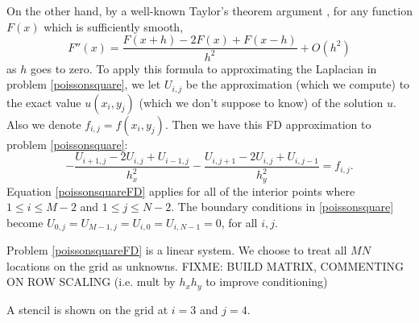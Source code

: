 On the other hand, by a well-known Taylor's theorem argument \citep{MortonMayers}, for any function $F(x)$ which is sufficiently smooth,
    $$F''(x) = \frac{F(x+h) - 2 F(x) + F(x-h)}{h^2} + O(h^2)$$
as $h$ goes to zero.  To apply this formula to approximating the Laplacian in problem \eqref{poissonsquare}, we let $U_{i,j}$ be the approximation (which we compute) to the exact value $u(x_i,y_j)$ (which we don't suppose to know) of the solution $u$.  Also we denote $f_{i,j} = f(x_i,y_j)$.  Then we have this FD approximation to problem \eqref{poissonsquare}:
\begin{equation}
- \frac{U_{i+1,j} - 2 U_{i,j} + U_{i-1,j}}{h_x^2} - \frac{U_{i,j+1} - 2 U_{i,j} + U_{i,j-1}}{h_y^2} = f_{i,j}. \label{poissonsquareFD}
\end{equation}
Equation \eqref{poissonsquareFD} applies for all of the interior points where $1 \le i \le M-2$ and $1 \le j \le N-2$.  The boundary conditions in \eqref{poissonsquare} become $U_{0,j} = U_{M-1,j} = U_{i,0} = U_{i,N-1} = 0$, for all $i,j$.

Problem \eqref{poissonsquareFD} is a linear system.  We choose to treat all $MN$ locations on the grid as unknowns. FIXME: BUILD MATRIX, COMMENTING ON ROW SCALING (i.e. mult by $h_x h_y$ to improve conditioning)


\begin{marginfigure}
\caption{A stencil is shown on the grid at $i=3$ and $j=4$.}
\label{fig:unitsquaregridstencil}
\end{marginfigure}


